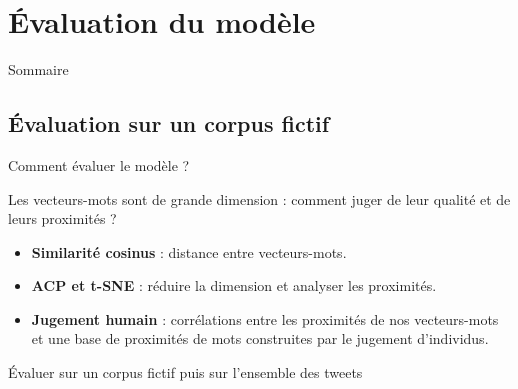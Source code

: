 \documentclass[10pt,xcolor=table,color={dvipsnames,usenames},ignorenonframetext,usepdftitle=false,french]{beamer}
\begin{document}
\hypertarget{uxe9valuation-du-moduxe8le}{%
\section{Évaluation du modèle}\label{uxe9valuation-du-moduxe8le}}

\begin{frame}{Sommaire}
\protect\hypertarget{sommaire-1}{}


\end{frame}

\hypertarget{uxe9valuation-sur-un-corpus-fictif}{%
\subsection{Évaluation sur un corpus
fictif}\label{uxe9valuation-sur-un-corpus-fictif}}

\begin{frame}{Comment évaluer le modèle ?}
\protect\hypertarget{comment-uxe9valuer-le-moduxe8le}{}

Les vecteurs-mots sont de grande dimension : comment juger de leur
qualité et de leurs proximités ?

\begin{itemize}
\item
  \textbf{Similarité cosinus} : distance entre vecteurs-mots.
\item
  \textbf{ACP et t-SNE} : réduire la dimension et analyser les
  proximités.
\item
  \textbf{Jugement humain} : corrélations entre les proximités de nos
  vecteurs-mots et une base de proximités de mots construites par le
  jugement d'individus.
\end{itemize}

\bigskip

\faArrowCircleRight{} Évaluer sur un corpus fictif puis sur l'ensemble
des tweets

\end{frame}
\end{document}
